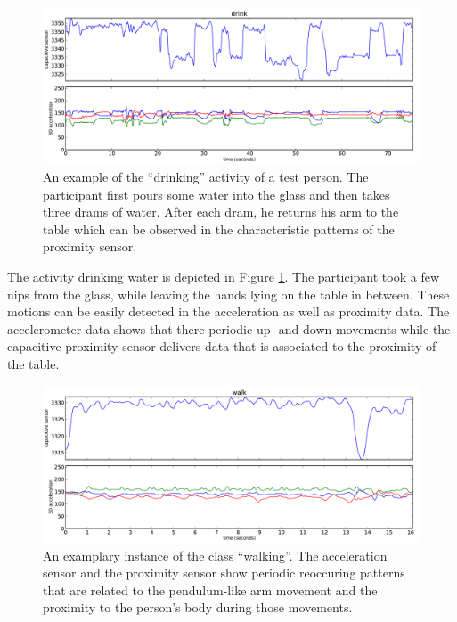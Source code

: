 \documentclass[runningheads,a4paper]{llncs}
\begin{document}
\begin{figure}[htpb]
	\centering
		\includegraphics[width=\textwidth]{../Auswertung/images/eugen_7.pdf}
	\caption{An example of the ``drinking'' activity of a test person. The participant first pours some water into the glass and then takes three drams of water. After each dram, he returns his arm to the table which can be observed in the characteristic patterns of the proximity sensor.}
	\label{fig:eugen_7}
\end{figure}

The activity drinking water is depicted in Figure \ref{fig:eugen_7}. The participant took a few nips from the glass, while leaving the hands lying on the table in between. These motions can be easily detected in the acceleration as well as proximity data. The accelerometer data shows that there periodic up- and down-movements while the capacitive proximity sensor delivers data that is associated to the proximity of the table.

\begin{figure}[htbp]
	\centering
		\includegraphics[width=1.00\textwidth]{../Auswertung/images/marko_8.pdf}
	\caption{An examplary instance of the class ``walking''. The acceleration sensor and the proximity sensor show periodic reoccuring patterns that are related to the pendulum-like arm movement and the proximity to the person's body during those movements.}
	\label{fig:marko_8}
\end{figure}
\end{document}
